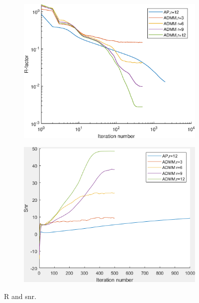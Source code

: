 \documentclass{article}
\numberwithin{equation}{section}
\begin{document}
\begin{enumerate}[leftmargin=*]
  \begin{figure}[H]
  \begin{subfigure}{.5\textwidth}
     \centering
     \includegraphics[width=0.9\linewidth]{../figures/modes_R.eps}  
     \label{fig:modes_R}
  \end{subfigure}
  \begin{subfigure}{.5\textwidth}
     \centering
     \includegraphics[width=.9\linewidth]{../figures/modes_snr.png}  
     \label{fig:modes_snr}
  \end{subfigure}
  \caption{R and snr. }
  \label{fig:noise}
  \end{figure}



\end{enumerate}
\end{document}
